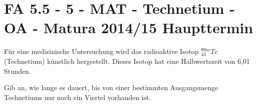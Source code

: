 \section{FA 5.5 - 5 - MAT - Technetium - OA - Matura 2014/15 Haupttermin}

\begin{beispiel}[FA 5.5]{1} %
Für eine medizinische Untersuchung wird das radioaktive Isotop $^{99m}_{43}Tc$ \mbox{(Technetium)} künstlich hergestellt. Dieses Isotop hat eine Halbwertszeit von 6,01 Stunden. \leer

Gib an, wie lange es dauert, bis von einer bestimmten Ausgangsmenge Technetiums nur
noch ein Viertel vorhanden ist.

\end{beispiel}
